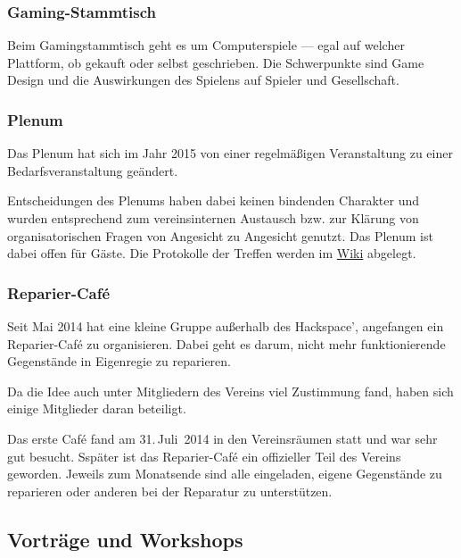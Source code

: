 \documentclass[ngerman]{scrartcl}
\begin{document}
\subsubsection{Gaming-Stammtisch}

Beim Gamingstammtisch geht es um Computerspiele — egal auf welcher
Plattform, ob gekauft oder selbst geschrieben. Die Schwerpunkte sind
Game Design und die Auswirkungen des Spielens auf Spieler und
Gesellschaft.

\subsubsection{Plenum}

Das Plenum hat sich im Jahr 2015 von einer regelmäßigen Veranstaltung
zu einer Bedarfsveranstaltung geändert.

Entscheidungen des Plenums haben dabei keinen bindenden Charakter und
wurden entsprechend zum vereinsinternen Austausch bzw. zur Klärung von
organisatorischen Fragen von Angesicht zu Angesicht genutzt. Das
Plenum ist dabei offen für Gäste.  Die Protokolle der Treffen werden
im \href{https://www.krautspace.de/hswiki:verein:plenum:start}{Wiki}
abgelegt.

\subsubsection{Reparier-Café}

Seit Mai 2014 hat eine kleine Gruppe außerhalb des Hackspace',
angefangen ein Reparier-Café zu organisieren. Dabei geht es darum,
nicht mehr funktionierende Gegenstände in Eigenregie zu reparieren.

Da die Idee auch unter Mitgliedern des Vereins viel Zustimmung fand,
haben sich einige Mitglieder daran beteiligt.

Das erste Café fand am 31.\,Juli~2014 in den Vereinsräumen statt und
war sehr gut besucht.  Sspäter ist das Reparier-Café ein offizieller
Teil des Vereins geworden. Jeweils zum Monatsende sind alle
eingeladen, eigene Gegenstände zu reparieren oder anderen bei der
Reparatur zu unterstützen.


\subsection{Vorträge und Workshops}
\end{document}
